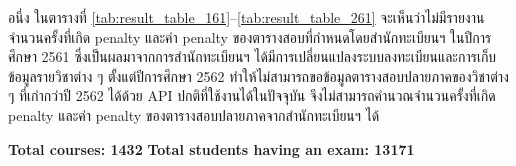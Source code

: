 อนึ่ง ในตารางที่ \ref{tab:result_table_161}--\ref{tab:result_table_261} จะเห็นว่าไม่มีรายงานจำนวนครั้งที่เกิด penalty และค่า penalty ของตารางสอบที่กำหนดโดยสำนักทะเบียนฯ ในปีการศึกษา 2561
ซึ่งเป็นผลมาจากการสำนักทะเบียนฯ ได้มีการเปลี่ยนแปลงระบบลงทะเบียนและการเก็บข้อมูลรายวิชาต่าง ๆ ตั้งแต่ปีการศึกษา 2562 ทำให้ไม่สามารถขอข้อมูลตารางสอบปลายภาคของวิชาต่าง ๆ ที่เก่ากว่าปี 2562 ได้ด้วย API ปกติที่ใช้งานได้ในปัจจุบัน
จึงไม่สามารถคำนวณจำนวนครั้งที่เกิด penalty และค่า penalty ของตารางสอบปลายภาคจากสำนักทะเบียนฯ ได้
%
\begin{table}[]
    \centering
    \textbf{Total courses: 1432} \quad \quad \textbf{Total students having an exam: 13171}
\end{table}
